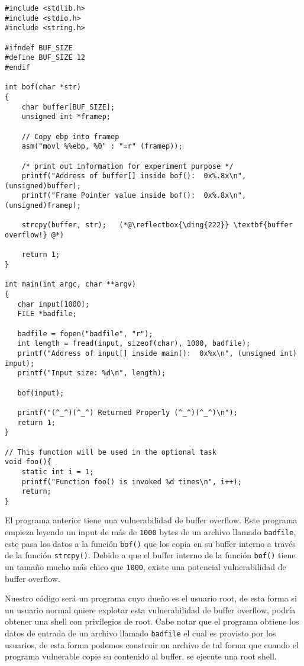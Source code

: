 \begin{lstlisting}[caption={The vulnerable program (\texttt{retlib.c})}]
#include <stdlib.h>
#include <stdio.h>
#include <string.h>

#ifndef BUF_SIZE
#define BUF_SIZE 12
#endif

int bof(char *str)
{
    char buffer[BUF_SIZE];
    unsigned int *framep;

    // Copy ebp into framep
    asm("movl %%ebp, %0" : "=r" (framep));      

    /* print out information for experiment purpose */
    printf("Address of buffer[] inside bof():  0x%.8x\n", (unsigned)buffer);
    printf("Frame Pointer value inside bof():  0x%.8x\n", (unsigned)framep);

    strcpy(buffer, str);   (*@\reflectbox{\ding{222}} \textbf{buffer overflow!} @*)

    return 1;
}

int main(int argc, char **argv)
{
   char input[1000];
   FILE *badfile;

   badfile = fopen("badfile", "r");
   int length = fread(input, sizeof(char), 1000, badfile);
   printf("Address of input[] inside main():  0x%x\n", (unsigned int) input);
   printf("Input size: %d\n", length);

   bof(input);

   printf("(^_^)(^_^) Returned Properly (^_^)(^_^)\n");
   return 1;
}

// This function will be used in the optional task
void foo(){
    static int i = 1;
    printf("Function foo() is invoked %d times\n", i++);
    return;
}
\end{lstlisting}

El programa anterior tiene una vulnerabilidad de buffer overflow. Este programa empieza leyendo un input de más de \texttt{1000} bytes de un archivo llamado \texttt{badfile}, este pasa los datos a la función \texttt{bof()} que los copia en su buffer interno a través de la función \texttt{strcpy()}.
Debido a que el buffer interno de la función \texttt{bof()} tiene un tamaño mucho más chico que \texttt{1000}, existe una potencial vulnerabilidad de buffer overflow.

Nuestro código será un programa \setuid cuyo dueño es el usuario root, de esta forma si un usuario normal quiere explotar esta vulnerabilidad de buffer overflow, podría obtener una shell con privilegios de root. 
Cabe notar que el programa obtiene los datos de entrada de un archivo llamado \texttt{badfile} el cual es provisto por los usuarios, de esta forma podemos construir un archivo de tal forma que cuando el programa vulnerable copie su contenido al buffer, se ejecute una root shell.


